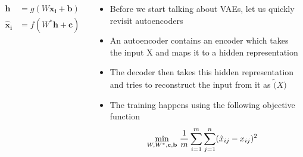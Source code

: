 \begin{frame}
\end{frame}


\begin{frame}
	\begin{columns}
		\begin{overlayarea}{\textwidth}{\textheight}
			\vspace{3pt}
			
			\vspace{-20pt}
			\begin{align*}
				\mathbf{h} &= g(W\mathbf{x_i} +\mathbf{b})\\
				\mathbf{\hat{x}_i} &= f(W^*\mathbf{h} +\mathbf{c})      
			\end{align*}

		\end{overlayarea}
		\begin{overlayarea}{\textwidth}{\textheight}
			\begin{itemize}[<+->]\justifying
				\item Before we start talking about VAEs, let us quickly revisit autoencoders
				\item An autoencoder contains an encoder which takes the input X and maps it to a hidden representation
				\item The decoder then takes this hidden representation and tries to reconstruct the input from it as $\tilde(X)$
				\item The training happens using the following objective function
                \begin{align*}
                    & \min \limits_{W,W^*,\mathbf{c},\mathbf{b}}\hspace{0.5mm} \frac{1}{m}\sum_{i=1}^{m}\sum_{j=1}^{n} (\hat{x}_{ij}- x_{ij})^2 
                \end{align*}
			\end{itemize}
		\end{overlayarea}
	\end{columns}
\end{frame}


